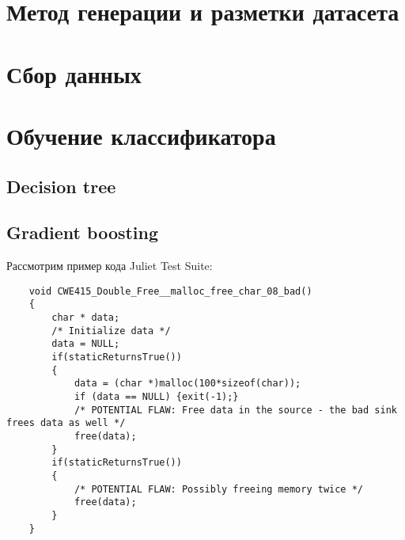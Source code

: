 \section{Метод генерации и разметки датасета}



\section{Сбор данных}

\section{Обучение классификатора}

\subsection{Decision tree}
\subsection{Gradient boosting}

Рассмотрим пример кода Juliet Test Suite:

\begin{verbatim}
    void CWE415_Double_Free__malloc_free_char_08_bad()
    {
        char * data;
        /* Initialize data */
        data = NULL;
        if(staticReturnsTrue())
        {
            data = (char *)malloc(100*sizeof(char));
            if (data == NULL) {exit(-1);}
            /* POTENTIAL FLAW: Free data in the source - the bad sink frees data as well */
            free(data);
        }
        if(staticReturnsTrue())
        {
            /* POTENTIAL FLAW: Possibly freeing memory twice */
            free(data);
        }
    }
\end{verbatim}

